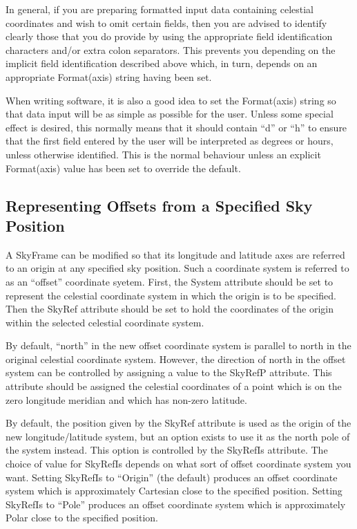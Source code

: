 \documentclass[twoside,11pt]{article}
\begin{document}
In general, if you are preparing formatted input data containing
celestial coordinates and wish to omit certain fields, then you are
advised to identify clearly those that you do provide by using the
appropriate field identification characters and/or extra colon
separators. This prevents you depending on the implicit field
identification described above which, in turn, depends on an
appropriate Format(axis) string having been set.

When writing software, it is also a good idea to set the Format(axis)
string so that data input will be as simple as possible for the
user. Unless some special effect is desired, this normally means that
it should contain ``d'' or ``h'' to ensure that the first field
entered by the user will be interpreted as degrees or hours, unless
otherwise identified. This is the normal behaviour unless an explicit
Format(axis) value has been set to override the default.

\subsection{Representing Offsets from a Specified Sky Position}
A SkyFrame can be modified so that its longitude and latitude axes are
referred to an origin at any specified sky position. Such a coordinate
system is referred to as an ``offset'' coordinate syetem. First, the System
attribute should be set to represent the celestial coordinate system in
which the origin is to be specified. Then the SkyRef attribute should be
set to hold the coordinates of the origin within the selected celestial
coordinate system.

By default, ``north'' in the new offset coordinate system is parallel to
north in the original celestial coordinate system. However, the direction
of north in the offset system can be controlled by assigning a value to
the SkyRefP attribute. This attribute should be assigned the celestial
coordinates of a point which is on the zero longitude meridian and which
has non-zero latitude.

By default, the position given by the SkyRef attribute is used as the
origin of the new longitude/latitude system, but an option exists to use
it as the north pole of the system instead. This option is controlled by
the SkyRefIs attribute. The choice of value for SkyRefIs depends on what
sort of offset coordinate system you want. Setting SkyRefIs to
``Origin'' (the default) produces an offset coordinate system which is
approximately Cartesian close to the specified position. Setting SkyRefIs
to
``Pole'' produces an offset coordinate system which is approximately Polar
close to the specified position.
\end{document}
